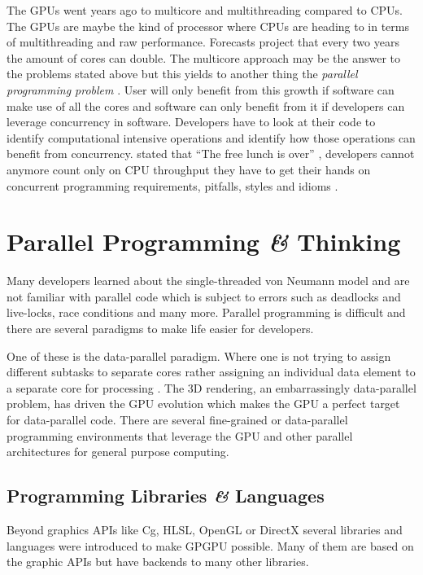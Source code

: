 The \glspl{GPU} went years ago to multicore and multithreading compared to
\glspl{CPU}. The \glspl{GPU} are maybe the kind of processor where \glspl{CPU}
are heading to in terms of multithreading and raw performance. Forecasts project
that every two years the amount of cores can double. The multicore approach may
be the answer to the problems stated above but this yields to another thing the
\emph{parallel programming problem} \citep{citeulike:3750573}. User will only
benefit from this growth if software can make use of all the cores and software
can only benefit from it if developers can leverage concurrency in software.
Developers have to look at their code to identify computational intensive
operations and identify how those operations can benefit from concurrency.
\citep{citeulike:6643735} stated that ``The free
lunch is over'' , developers cannot anymore count only on \gls{CPU} throughput
they have to get their hands on concurrent programming requirements, pitfalls,
styles and idioms \citep{citeulike:6643735}.


\section{Parallel Programming \textit{\&} Thinking} %
\label{sec:parallel_programming__thinking}

Many developers learned about the single-threaded von Neumann model and are not
familiar with parallel code which is subject to errors such as deadlocks and
live-locks, race conditions and many more. Parallel programming is difficult and
there are several paradigms to make life easier for developers.

One of these is the data-parallel paradigm. Where one is not trying to assign
different subtasks to separate cores rather assigning an individual data
element to a separate core for processing \citep{citeulike:3750565}. The
\gls{3D} rendering, an embarrassingly data-parallel problem, has driven the
\gls{GPU} evolution which makes the \gls{GPU} a perfect target for data-parallel
code. There are several fine-grained or data-parallel programming environments
that leverage the \gls{GPU} and other parallel architectures for general purpose
computing.

\subsection{Programming Libraries {\textit{\&}} Languages} %
\label{ssub:programming_libraries_and_languages}
Beyond graphics \glspl{API} like Cg, \gls{HLSL}, OpenGL or DirectX several 
libraries and languages were introduced to make \gls{GPGPU} possible. Many of them
are based on the graphic \glspl{API} but have backends to many other libraries. 

